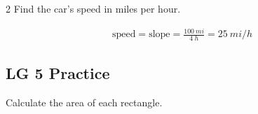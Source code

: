 \documentclass[]{exam}
\begin{document}
\begin{questions}
\begin{multicols}{2}
\question
Find the car's speed in miles per hour.


\begin{solution}

\begin{align*}
    \mathrm{speed} = \mathrm{slope} = \frac{\SI{100}{mi}}{\SI{4}{h}} = \boxed{\SI{25}{mi/h}}
\end{align*}
\end{solution}
\end{multicols}
\end{questions}

\clearpage

\subsection*{LG 5 Practice}

\newcommand{\rectangleI}[3]{%
    \begin{tikzpicture}[y=1mm*#3,x=1mm*#3]
        \draw[thick,fill=black!10] (0,0) -- (#1,0) node[below,pos=0.5] {#1} -- (#1,#2) -- (0,#2) -- cycle node[left,pos=0.5] {#2};
    \end{tikzpicture}
}

Calculate the area of each rectangle.
\end{document}
